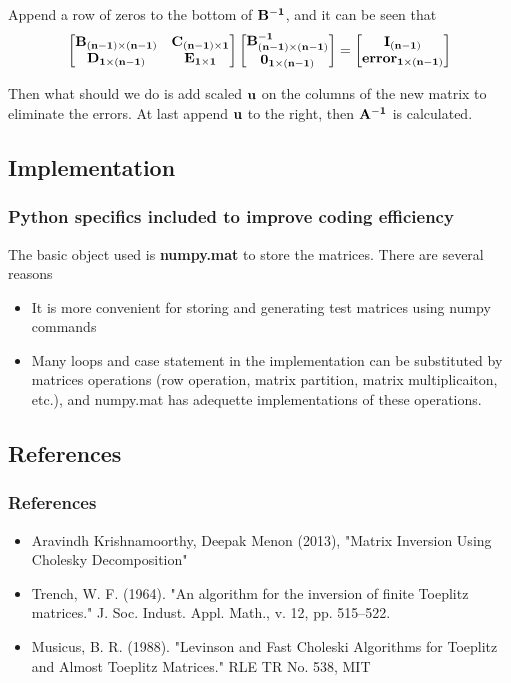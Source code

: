 \documentclass{beamer}
\begin{document}
\begin{frame}
Append a row of zeros to the bottom of ${\bf B^{-1}}$, and it can be seen that $$\left[\begin{matrix}\bf B_{(n-1)\times(n-1)} & \bf C_{(n-1)\times 1} \\\bf D_{1\times (n-1)} & \bf E_{1\times 1}\end{matrix}\right]\left[\begin{matrix}\bf B^{-1}_{(n-1)\times (n-1)} \\ \bf 0_{1\times (n-1)} \end{matrix}\right] = \left[\begin{matrix}\bf I_{(n-1)} \\ \bf error_{1\times (n-1)} \end{matrix}\right]$$

Then what should we do is add scaled $\bf u$ on the columns of the new matrix to eliminate the errors. At last append $\bf u$ to the right, then ${\bf A^{-1}}$ is calculated.
\end{frame}

\begin{frame}
	\section{Implementation}
	\frametitle{Python specifics included to improve coding efficiency}
	The basic object used is {\bf numpy.mat} to store the matrices. There are several reasons 

	\begin{itemize}
		\item It is more convenient for storing and generating test matrices using numpy commands
		\item Many loops and case statement in the implementation can be substituted by matrices operations (row operation, matrix partition, matrix multiplicaiton, etc.), and numpy.mat has adequette implementations of these operations.
	\end{itemize}
\end{frame}

\begin{frame}
	\section{References}
	\frametitle{References}
	\begin{itemize}
		\item Aravindh Krishnamoorthy, Deepak Menon (2013),  "Matrix Inversion Using Cholesky Decomposition"
		\item Trench, W. F. (1964). "An algorithm for the inversion of finite Toeplitz matrices." J. Soc. Indust. Appl. Math., v. 12, pp. 515–522.
		\item Musicus, B. R. (1988). "Levinson and Fast Choleski Algorithms for Toeplitz and Almost Toeplitz Matrices." RLE TR No. 538, MIT
	\end{itemize}
\end{frame}
\end{document}

